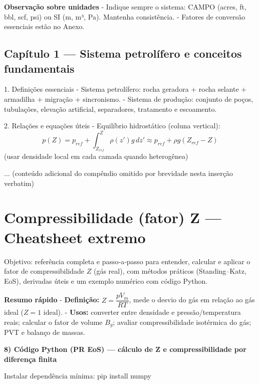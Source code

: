 \documentclass[11pt,a4paper]{article}
\begin{document}
\textbf{Observação sobre unidades}
- Indique sempre o sistema: CAMPO (acres, ft, bbl, scf, psi) ou SI (m, m³, Pa). Mantenha consistência.
- Fatores de conversão essenciais estão no Anexo.
\subsection{Capítulo 1 — Sistema petrolífero e conceitos fundamentais}

1. Definições essenciais
- Sistema petrolífero: rocha geradora + rocha selante + armadilha + migração + sincronismo. 
- Sistema de produção: conjunto de poços, tubulações, elevação artificial, separadores, tratamento e escoamento.

2. Relações e equações úteis
- Equilíbrio hidrostático (coluna vertical):
$$p(Z)=p_{ref}+\int_{Z_{ref}}^{Z}\rho(z') g\,dz'\approx p_{ref}+\rho g (Z_{ref}-Z)$$
(usar densidade local em cada camada quando heterogênea)

... (conteúdo adicional do compêndio omitido por brevidade nesta inserção verbatim)
\section{Compressibilidade (fator) Z — Cheatsheet extremo}

Objetivo: referência completa e passo‑a‑passo para entender, calcular e aplicar o fator de compressibilidade $Z$ (gás real), com métodos práticos (Standing–Katz, EoS), derivadas úteis e um exemplo numérico com código Python.


\textbf{Resumo rápido}
- \textbf{Definição:} $Z = \dfrac{p V_m}{R T}$, mede o desvio do gás em relação ao gás ideal ($Z=1$ ideal).
- \textbf{Usos:} converter entre densidade e pressão/temperatura reais; calcular o fator de volume $B_g$; avaliar compressibilidade isotérmica do gás; PVT e balanço de massas.


\textbf{8) Código Python (PR EoS) — cálculo de Z e compressibilidade por diferença finita}

Instalar dependência mínima: pip install numpy
\end{document}
